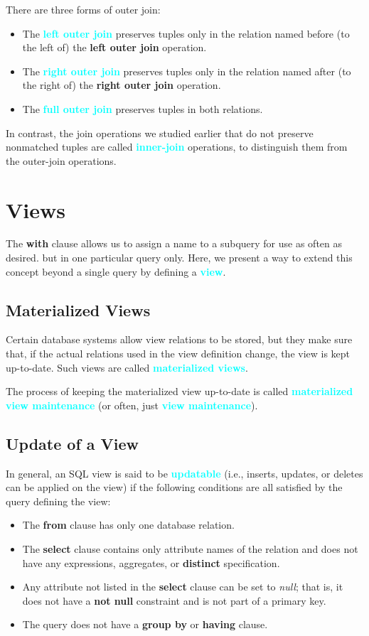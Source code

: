 \documentclass{Beautybook-EN}
\newcommand{\textcy}[1]{\textbf{\textcolor{cyan}{#1}}}
\begin{document}
There are three forms of outer join:
\begin{itemize}
    \item The \textcy{left outer join} preserves tuples only in the relation named before (to the left of) the \textbf{left outer join} operation.
    \item The \textcy{right outer join} preserves tuples only in the relation named after (to the right of) the \textbf{right outer join} operation.
    \item The \textcy{full outer join} preserves tuples in both relations.
\end{itemize}
In contrast, the join operations we studied earlier that do not preserve nonmatched tuples are called \textcy{inner-join} operations, to distinguish them from the outer-join operations.

\section{Views}

The \textbf{with} clause allows us to assign a name to a subquery for use as often as desired. but in one particular query only. Here, we present a way to extend this concept beyond a single query by defining a \textcy{view}.

\subsection{Materialized Views}

Certain database systems allow view relations to be stored, but they make sure that, if the actual relations used in the view definition change, the view is kept up-to-date. Such views are called \textcy{materialized views}.

The process of keeping the materialized view up-to-date is called \textcy{materialized view maintenance} (or often, just \textcy{view maintenance}).

\subsection{Update of a View}

In general, an SQL view is said to be \textcy{updatable} (i.e., inserts, updates, or deletes can be applied on the view) if the following conditions are all satisfied by the query defining the view:
\begin{itemize}
    \item The \textbf{from} clause has only one database relation.
    \item The \textbf{select} clause contains only attribute names of the relation and does not have any expressions, aggregates, or \textbf{distinct} specification.
    \item Any attribute not listed in the \textbf{select} clause can be set to \textit{null}; that is, it does not have a \textbf{not null} constraint and is not part of a primary key.
    \item The query does not have a \textbf{group by} or \textbf{having} clause.
\end{itemize}
\end{document}
